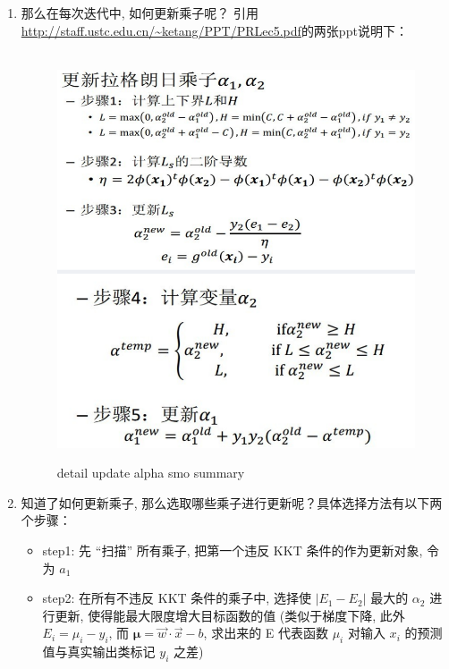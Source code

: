 \documentclass[oneside, 12pt]{ctexbook}
\begin{document}
\begin{enumerate}
\begin{enumerate}[(1)]
\begin{enumerate}
									\item 那么在每次迭代中, 如何更新乘子呢？ 引用\url{http://staff.ustc.edu.cn/~ketang/PPT/PRLec5.pdf}的两张ppt说明下：
										\begin{figure}[H]
											\vspace{-0.2cm}  %
											\setlength{\abovecaptionskip}{-0.2cm}   %
											\centering
											\includegraphics[scale=0.7]{detail_update_alpha_smo_summary.png}
											\renewcommand{\figurename}{Fig} %
											\caption{detail update alpha smo summary}
											\label{detail_update_alpha_smo_summary}
										\end{figure}
									
									\item 知道了如何更新乘子, 那么选取哪些乘子进行更新呢？具体选择方法有以下两个步骤：
										\begin{itemize}
											\item step1: 先 “扫描” 所有乘子, 把第一个违反 KKT 条件的作为更新对象, 令为 $a_1$
											
											\item step2: 在所有不违反 KKT 条件的乘子中, 选择使 $|E_1 - E_2|$ 最大的 $\alpha_2$ 进行更新, 使得能最大限度增大目标函数的值 (类似于梯度下降, 此外 $E_i = \mu_i - y_i$, 而 $\boldsymbol{\mu} = \vec{w} \cdot \vec{x} - b$, 求出来的 E 代表函数 $\mu_i$ 对输入 $x_i$ 的预测值与真实输出类标记 $y_i$ 之差)
										\end{itemize}
									

\end{enumerate}
\end{enumerate}
\end{enumerate}
\end{document}
